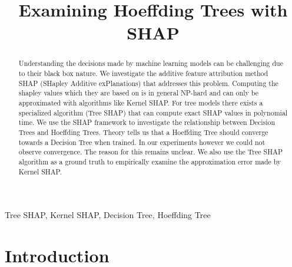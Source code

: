 \documentclass[conference]{IEEEtran}
\begin{document}
\title{Examining Hoeffding Trees with SHAP}

\author{
}

\maketitle
\thispagestyle{plain}
\pagestyle{plain}

\begin{abstract}
Understanding the decisions made by machine learning models can be challenging due to their black box nature.
We investigate the additive feature attribution method SHAP (SHapley Additive exPlanations) that addresses this problem. 
Computing the shapley values which they are based on is in general NP-hard and can only be approximated with algorithms like Kernel SHAP.
For tree models there exists a specialized algorithm (Tree SHAP) that can compute exact SHAP values in polynomial time. 
We use the SHAP framework to investigate the relationship between Decision Trees and Hoeffding Trees. 
Theory tells us that a Hoeffding Tree should converge towards a Decision Tree when trained. 
In our experiments however we could not observe convergence. 
The reason for this remains unclear.
We also use the Tree SHAP algorithm as a ground truth to empirically examine the approximation error made by Kernel SHAP.
\end{abstract}

\begin{IEEEkeywords}
Tree SHAP, Kernel SHAP, Decision Tree, Hoeffding Tree
\end{IEEEkeywords}

\section{Introduction}
\end{document}

